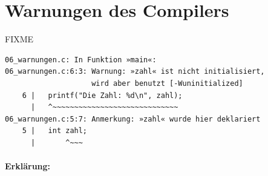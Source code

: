 \section{Warnungen des Compilers}
\label{sec:c:warnungen}

FIXME


\small
\begin{verbatim}
06_warnungen.c: In Funktion »main«:
06_warnungen.c:6:3: Warnung: »zahl« ist nicht initialisiert, 
                    wird aber benutzt [-Wuninitialized]
    6 |   printf("Die Zahl: %d\n", zahl);
      |   ^~~~~~~~~~~~~~~~~~~~~~~~~~~~~~
06_warnungen.c:5:7: Anmerkung: »zahl« wurde hier deklariert
    5 |   int zahl;
      |       ^~~~
\end{verbatim}
\normalsize

\paragraph{Erklärung:}





